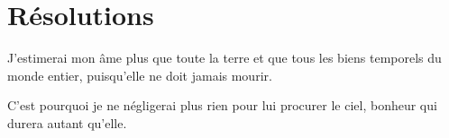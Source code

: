 \documentclass[instructions.tex]{subfiles}
\begin{document}
\section{Résolutions}
 
\primo J’estimerai mon âme plus que toute la terre et que tous les biens temporels du monde entier, puisqu’elle ne doit jamais mourir.

\secundo C’est pourquoi je ne négligerai plus rien pour lui procurer le ciel, bonheur qui durera autant qu’elle. 

 
\end{document}
